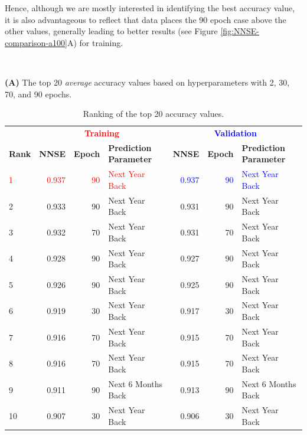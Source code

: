 \documentclass[utf8]{FrontiersinVancouver} %
\begin{document}
Hence, although we are mostly interested in identifying the best
accuracy value, it is also advantageous to reflect that data places
the 90 epoch case above the other values, generally leading to better
results (see Figure \ref{fig:NNSE-comparison-a100}A) for training.


    \begin{table}[htb]
      \caption{Ranking of the top 20 accuracy values.}\
      \label{tab:ranking-accuracy}
    
        {\bf (A)} The top 20 {\em average} accuracy values based on hyperparameters with 2, 30, 70, and 90 epochs.\

\renewcommand{\arraystretch}{1.2}
      \begin{center}
        {\footnotesize
    \begin{tabular}{|l||r|r|l|r|r|l|}
      \hline
     &   \multicolumn{3}{c|}{\bf \textcolor{red}{Training}}  & \multicolumn{3}{c|}{\bf \textcolor{blue}{Validation}}  \\
    {\bf Rank} &  {\bf NNSE} &  {\bf Epoch} & {\bf Prediction Parameter} & {\bf NNSE} &  {\bf Epoch} & {\bf Prediction Parameter}\\
    \hline
    \hline
        \textcolor{red}{1}  &  \textcolor{red}{0.937} &     \textcolor{red}{90} &  \textcolor{red}{Next Year Back} &  \textcolor{blue}{0.937} &     \textcolor{blue}{90} &  \textcolor{blue}{Next Year Back} \\
    2  &  0.933 &     90 &      Next Year Back &  0.931 &     90 &      Next Year Back \\
3  &  0.932 &     70 &      Next Year Back &  0.931 &     70 &      Next Year Back \\
4  &  0.928 &     90 &      Next Year Back &  0.927 &     90 &      Next Year Back \\
5  &  0.926 &     90 &      Next Year Back &  0.925 &     90 &      Next Year Back \\
6  &  0.919 &     30 &      Next Year Back &  0.917 &     30 &      Next Year Back \\
7  &  0.916 &     70 &      Next Year Back &  0.915 &     70 &      Next Year Back \\
8  &  0.916 &     70 &      Next Year Back &  0.915 &     70 &      Next Year Back \\
9  &  0.911 &     90 &  Next 6 Months Back &  0.913 &     90 &  Next 6 Months Back \\
10  &  0.907 &     30 &      Next Year Back &  0.906 &     30 &      Next Year Back \\

\end{tabular}}
\end{center}
\end{table}
\end{document}
